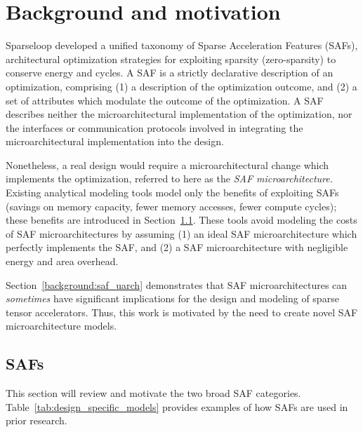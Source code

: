 \chapter{Background and motivation}

Sparseloop\cite{sparseloop} developed a unified taxonomy of Sparse Acceleration Features (SAFs), architectural optimization strategies for exploiting sparsity (zero-sparsity) to conserve energy and cycles. A SAF is a strictly declarative description of an optimization, comprising (1) a description of the optimization outcome, and (2) a set of attributes which modulate the outcome of the optimization. A SAF describes neither the microarchitectural implementation of the optimization, nor the interfaces or communication protocols involved in integrating the microarchitectural implementation into the design. 

Nonetheless, a real design would require a microarchitectural change which implements the optimization, referred to here as the \textit{SAF microarchitecture.} Existing analytical modeling tools\cite{sparseloop} model only the benefits of exploiting SAFs (savings on memory capacity, fewer memory accesses, fewer compute cycles); these benefits are introduced in Section~\ref{background:safs}. These tools avoid modeling the costs of SAF microarchitectures by assuming (1) an ideal SAF microarchitecture which perfectly implements the SAF, and (2) a SAF microarchitecture with negligible energy and area overhead.

Section~\ref{background:saf_uarch} demonstrates that SAF microarchitectures can \textit{sometimes} have significant implications for the design and modeling of sparse tensor accelerators. Thus, this work is motivated by the need to create novel SAF microarchitecture models.
%
%
\section{SAFs}
\label{background:safs}

This section will review and motivate the two broad SAF categories. Table~\ref{tab:design_specific_models} provides examples of how SAFs are used in prior research.

